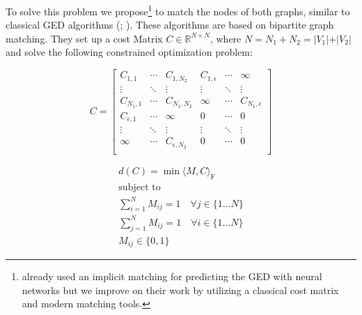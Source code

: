To solve this problem we propose\footnote{\cite{riba2018} already used an implicit matching for predicting the GED with neural networks but we improve on their work by utilizing a classical cost matrix and modern matching tools.} to match the nodes of both graphs, similar to classical GED algorithms (\citealp{hungarian2009}; \citealp{frankhauser2011}). These algorithms are based on bipartite graph matching. They set up a cost Matrix $C \in \mathbb{R}^{N \times N}$, where $N = N_1 + N_2 = \vert V_1 \vert + \vert V_2 \vert $ and solve the following constrained optimization problem:

\vspace{.2cm}

\noindent
\begin{minipage}{.5\linewidth}

     \[
          C=
               \left[
               \begin{array}{ccc|ccc}
                    C_{1,1} & \dotsi & C_{1, N_2} & C_{1, \epsilon} & \dotsi & \infty \\
                    \vdots & \ddots & \vdots & \vdots & \ddots & \vdots \\
                    C_{N_1, 1} & \dotsi & C_{N_1, N_2} & \infty & \dotsi & C_{N_1, \epsilon} \\
                    \hline
                    C_{\epsilon, 1} & \dotsi & \infty & 0 & \dotsi & 0 \\
                    \vdots & \ddots & \vdots & \vdots & \ddots & \vdots \\
                    \infty & \dotsi & C_{\epsilon, N_2} & 0 & \dotsi & 0 \\
               \end{array}
               \right]
     \]

\end{minipage}%
\begin{minipage}{.5\linewidth}

     \begin{equation}
          \begin{gathered}
               d(C) = \min \langle M, C \rangle_\mathrm{F} \\
               \text{subject to} \\
               \sum_{i = 1}^{N} M_{ij} = 1 \quad \forall j \in \{1 \dots N\} \\
               \sum_{j = 1}^{N} M_{ij} = 1 \quad \forall i \in \{1 \dots N\} \\
               M_{ij} \in \{0, 1\}
          \end{gathered}
     \end{equation}

\end{minipage}


